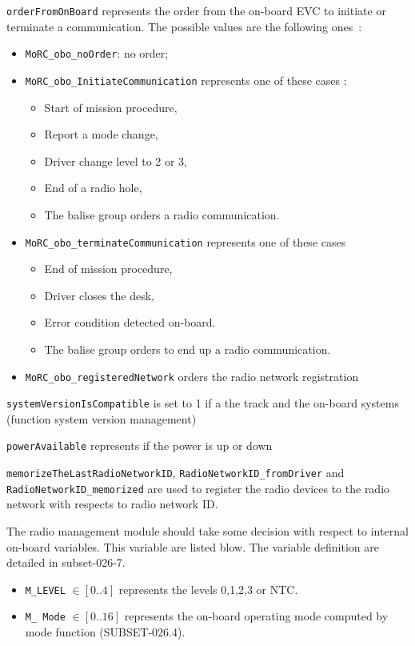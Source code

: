 \begin{description}
\item \verb+orderFromOnBoard+ represents the order from the on-board EVC to initiate
or terminate a communication. The possible values are the following ones~: 
  \begin{itemize}
  \item \verb+MoRC_obo_noOrder+:  no order;
  \item \verb+MoRC_obo_InitiateCommunication+ represents one of these cases :
	\begin{itemize}
	\item Start of mission procedure,
	\item Report a mode change,
	\item Driver change level to 2 or 3,
	\item End of a radio hole,
	\item The balise group orders a radio communication.
	\end{itemize}
  \item \verb+MoRC_obo_terminateCommunication+ represents one of these cases
	\begin{itemize}
	\item End of mission procedure, 
	\item Driver closes the desk,
	\item Error condition detected on-board.
	\item The balise group orders to end up a radio communication.
	\end{itemize}
 \item \verb+MoRC_obo_registeredNetwork+ orders the radio network registration
  \end{itemize}
\item \verb+systemVersionIsCompatible+ is set to 1 if a the track and the on-board systems
(function system version management)
\item \verb+powerAvailable+ represents if the power is up or down
\item  \verb+memorizeTheLastRadioNetworkID+,
  \verb+RadioNetworkID_fromDriver+ and \verb+RadioNetworkID_memorized+
  are used to register the radio devices to the radio network with
  respects to radio network ID.
\end{description}

The radio management module should take some decision with respect to internal
on-board variables.
This variable are listed blow. The variable definition
are detailed in subset-026-7.
\begin{itemize}
\item \verb+M_LEVEL+ $\in [0..4]$ represents the levels 0,1,2,3 or NTC.
\item \verb+M_ Mode+ $\in[0..16]$ represents the on-board operating mode
computed by mode function (SUBSET-026.4). 
\end{itemize}

